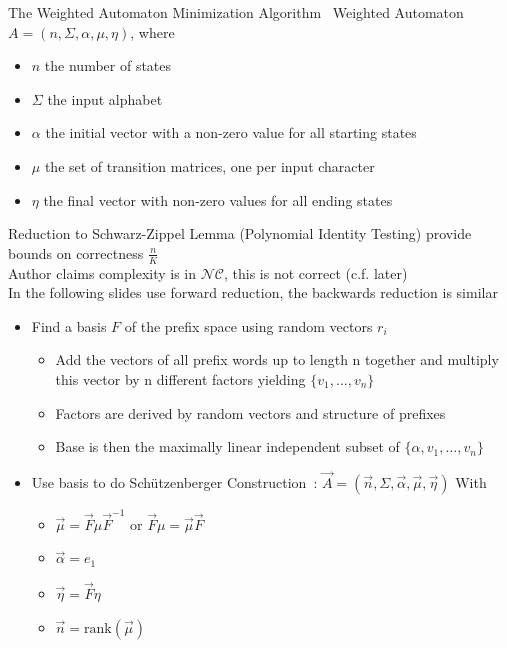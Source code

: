 \documentclass[rgb, pdf]{beamer}
\begin{document}
    \begin{frame}[allowframebreaks]{The Weighted Automaton Minimization Algorithm~\autocite{Kiefer2013OnTC}}
        Weighted Automaton $A = \left( n, \Sigma, \alpha, \mu, \eta \right)$, where
        \begin{itemize}
         \item $n$ the number of states
         \item $\Sigma$ the input alphabet
         \item $\alpha$ the initial vector with a non-zero value for all starting states
         \item $\mu$ the set of transition matrices, one per input character
         \item $\eta$ the final vector with non-zero values for all ending states
        \end{itemize}
        \vspace{7cm}
        Reduction to Schwarz-Zippel Lemma (Polynomial Identity Testing) provide bounds on correctness $\frac{n}{K}$\\ \vspace{0.5cm}
        Author claims complexity is in $\mathcal{NC}$, this is not correct (c.f. later) \\ \vspace{0.5cm}
        In the following slides use forward reduction, the backwards reduction is similar
        \framebreak
        
        \begin{itemize}
         \item Find a basis $F$ of the prefix space using random vectors $r_i$
         \begin{itemize}
          \item Add the vectors of all prefix words up to length n together and multiply this vector by n different factors yielding $\{v_1, \dots, v_n\}$
          \item Factors are derived by random vectors and structure of prefixes
          \item Base is then the maximally linear independent subset of $\{ \alpha, v_1, \dots, v_n\}$
         \end{itemize}
         \vspace{0.5cm}
         \item Use basis to do Schützenberger Construction~\autocite{schutz}: $\overrightarrow{A} = (\overrightarrow{n}, \Sigma, \overrightarrow{\alpha}, \overrightarrow{\mu}, \overrightarrow{\eta})$
            With
            \begin{itemize}
             \item $\overrightarrow{\mu} = \overrightarrow{F} \mu \overrightarrow{F}^{-1}$ or $\overrightarrow{F} \mu = \overrightarrow{\mu} \overrightarrow{F}$
             \item $\overrightarrow{\alpha} = e_1$
             \item $\overrightarrow{\eta} = \overrightarrow{F}\eta$
             \item $\overrightarrow{n} = \text{rank}(\overrightarrow{\mu})$
            \end{itemize}


\end{itemize}
\end{frame}
\end{document}
